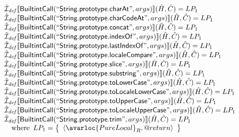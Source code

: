 \[\begin{array}{l}
\aI_{\it def}\lbr \SF{BuiltintCall}(``\SF{String.prototype.charAt}",args)\rbr(\hat{H},\hat{C}) = LP_1\\
\aI_{\it def}\lbr \SF{BuiltintCall}(``\SF{String.prototype.charCodeAt}",args)\rbr(\hat{H},\hat{C}) = LP_1\\
\aI_{\it def}\lbr \SF{BuiltintCall}(``\SF{String.prototype.concat}",args)\rbr(\hat{H},\hat{C}) = LP_1\\
\aI_{\it def}\lbr \SF{BuiltintCall}(``\SF{String.prototype.indexOf}",args)\rbr(\hat{H},\hat{C}) = LP_1\\
\aI_{\it def}\lbr \SF{BuiltintCall}(``\SF{String.prototype.lastIndexOf}",args)\rbr(\hat{H},\hat{C}) = LP_1\\
\aI_{\it def}\lbr \SF{BuiltintCall}(``\SF{String.prototype.localeCompare}",args)\rbr(\hat{H},\hat{C}) = LP_1\\
\aI_{\it def}\lbr \SF{BuiltintCall}(``\SF{String.prototype.slice}",args)\rbr(\hat{H},\hat{C}) = LP_1\\
\aI_{\it def}\lbr \SF{BuiltintCall}(``\SF{String.prototype.substring}",args)\rbr(\hat{H},\hat{C}) = LP_1\\
\aI_{\it def}\lbr \SF{BuiltintCall}(``\SF{String.prototype.toLowerCase}",args)\rbr(\hat{H},\hat{C}) = LP_1\\
\aI_{\it def}\lbr \SF{BuiltintCall}(``\SF{String.prototype.toLocaleLowerCase}",args)\rbr(\hat{H},\hat{C}) = LP_1\\
\aI_{\it def}\lbr \SF{BuiltintCall}(``\SF{String.prototype.toUpperCase}",args)\rbr(\hat{H},\hat{C}) = LP_1\\
\aI_{\it def}\lbr \SF{BuiltintCall}(``\SF{String.prototype.toLocaleUpperCase}",args)\rbr(\hat{H},\hat{C}) = LP_1\\
\aI_{\it def}\lbr \SF{BuiltintCall}(``\SF{String.prototype.trim}",args)\rbr(\hat{H},\hat{C}) = LP_1\\
\quad\wherec{
  LP_1 = \set{\langle\avarloc{PureLocal}_R,\varprop{return}\rangle}\\
  }\\
\\


\end{array}
\]
